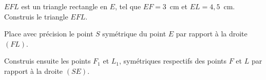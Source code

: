 \begin{myenumerate}
  \item $EFL$ est un triangle rectangle en $E$, tel que $EF=3$~cm et
$EL=4,5$~cm.\\Construis le triangle $EFL$.
\item Place avec précision le point $S$ symétrique du point $E$ par rapport à la droite $(FL)$.
\item Construis ensuite les points $F_1$ et $L_1$, symétriques respectifs des points $F$ et $L$ par rapport à la droite $(SE)$.
\end{myenumerate}
